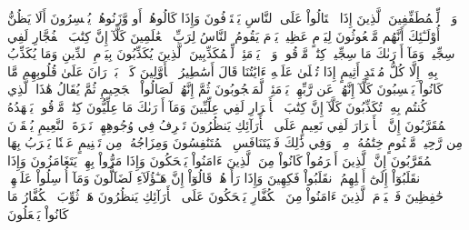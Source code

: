 وَيۡلٞ لِّلۡمُطَفِّفِينَ
ٱلَّذِينَ إِذَا ٱكۡتَالُواْ عَلَى ٱلنَّاسِ يَسۡتَوۡفُونَ
وَإِذَا كَالُوهُمۡ أَو وَّزَنُوهُمۡ يُخۡسِرُونَ
أَلَا يَظُنُّ أُوْلَـٰٓئِكَ أَنَّهُم مَّبۡعُوثُونَ
لِيَوۡمٍ عَظِيمٖ
يَوۡمَ يَقُومُ ٱلنَّاسُ لِرَبِّ ٱلۡعَٰلَمِينَ
كَلَّآ إِنَّ كِتَٰبَ ٱلۡفُجَّارِ لَفِي سِجِّينٖ
وَمَآ أَدۡرَىٰكَ مَا سِجِّينٞ
كِتَٰبٞ مَّرۡقُومٞ
وَيۡلٞ يَوۡمَئِذٖ لِّلۡمُكَذِّبِينَ
ٱلَّذِينَ يُكَذِّبُونَ بِيَوۡمِ ٱلدِّينِ
وَمَا يُكَذِّبُ بِهِۦٓ إِلَّا كُلُّ مُعۡتَدٍ أَثِيمٍ
إِذَا تُتۡلَىٰ عَلَيۡهِ ءَايَٰتُنَا قَالَ أَسَٰطِيرُ ٱلۡأَوَّلِينَ
كَلَّاۖ بَلۡۜ رَانَ عَلَىٰ قُلُوبِهِم مَّا كَانُواْ يَكۡسِبُونَ
كَلَّآ إِنَّهُمۡ عَن رَّبِّهِمۡ يَوۡمَئِذٖ لَّمَحۡجُوبُونَ
ثُمَّ إِنَّهُمۡ لَصَالُواْ ٱلۡجَحِيمِ
ثُمَّ يُقَالُ هَٰذَا ٱلَّذِي كُنتُم بِهِۦ تُكَذِّبُونَ
كَلَّآ إِنَّ كِتَٰبَ ٱلۡأَبۡرَارِ لَفِي عِلِّيِّينَ
وَمَآ أَدۡرَىٰكَ مَا عِلِّيُّونَ
كِتَٰبٞ مَّرۡقُومٞ
يَشۡهَدُهُ ٱلۡمُقَرَّبُونَ
إِنَّ ٱلۡأَبۡرَارَ لَفِي نَعِيمٍ
عَلَى ٱلۡأَرَآئِكِ يَنظُرُونَ
تَعۡرِفُ فِي وُجُوهِهِمۡ نَضۡرَةَ ٱلنَّعِيمِ
يُسۡقَوۡنَ مِن رَّحِيقٖ مَّخۡتُومٍ
خِتَٰمُهُۥ مِسۡكٞۚ وَفِي ذَٰلِكَ فَلۡيَتَنَافَسِ ٱلۡمُتَنَٰفِسُونَ
وَمِزَاجُهُۥ مِن تَسۡنِيمٍ
عَيۡنٗا يَشۡرَبُ بِهَا ٱلۡمُقَرَّبُونَ
إِنَّ ٱلَّذِينَ أَجۡرَمُواْ كَانُواْ مِنَ ٱلَّذِينَ ءَامَنُواْ يَضۡحَكُونَ
وَإِذَا مَرُّواْ بِهِمۡ يَتَغَامَزُونَ
وَإِذَا ٱنقَلَبُوٓاْ إِلَىٰٓ أَهۡلِهِمُ ٱنقَلَبُواْ فَكِهِينَ
وَإِذَا رَأَوۡهُمۡ قَالُوٓاْ إِنَّ هَـٰٓؤُلَآءِ لَضَآلُّونَ
وَمَآ أُرۡسِلُواْ عَلَيۡهِمۡ حَٰفِظِينَ
فَٱلۡيَوۡمَ ٱلَّذِينَ ءَامَنُواْ مِنَ ٱلۡكُفَّارِ يَضۡحَكُونَ
عَلَى ٱلۡأَرَآئِكِ يَنظُرُونَ
هَلۡ ثُوِّبَ ٱلۡكُفَّارُ مَا كَانُواْ يَفۡعَلُونَ